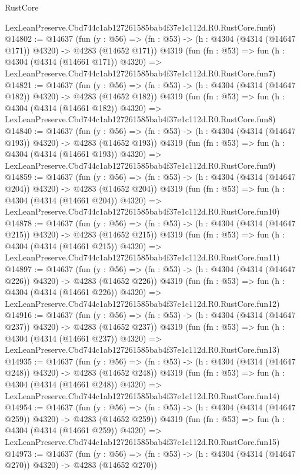 \begin{lexlean}{RustCore}
\begin{coremodule}
    LexLeanPreserve.Cbd744c1ab127261585bab4f37e1c112d.R0.RustCore.fun6)
@14802 := @14637
    (fun (y : @56) => (fn : @53) -> (h : @4304 (@4314 (@14647 @171)) @4320) -> @4283 (@14652 @171))
    @4319
    (fun (fn : @53) =>
    fun (h : @4304 (@4314 (@14661 @171)) @4320) =>
    LexLeanPreserve.Cbd744c1ab127261585bab4f37e1c112d.R0.RustCore.fun7)
@14821 := @14637
    (fun (y : @56) => (fn : @53) -> (h : @4304 (@4314 (@14647 @182)) @4320) -> @4283 (@14652 @182))
    @4319
    (fun (fn : @53) =>
    fun (h : @4304 (@4314 (@14661 @182)) @4320) =>
    LexLeanPreserve.Cbd744c1ab127261585bab4f37e1c112d.R0.RustCore.fun8)
@14840 := @14637
    (fun (y : @56) => (fn : @53) -> (h : @4304 (@4314 (@14647 @193)) @4320) -> @4283 (@14652 @193))
    @4319
    (fun (fn : @53) =>
    fun (h : @4304 (@4314 (@14661 @193)) @4320) =>
    LexLeanPreserve.Cbd744c1ab127261585bab4f37e1c112d.R0.RustCore.fun9)
@14859 := @14637
    (fun (y : @56) => (fn : @53) -> (h : @4304 (@4314 (@14647 @204)) @4320) -> @4283 (@14652 @204))
    @4319
    (fun (fn : @53) =>
    fun (h : @4304 (@4314 (@14661 @204)) @4320) =>
    LexLeanPreserve.Cbd744c1ab127261585bab4f37e1c112d.R0.RustCore.fun10)
@14878 := @14637
    (fun (y : @56) => (fn : @53) -> (h : @4304 (@4314 (@14647 @215)) @4320) -> @4283 (@14652 @215))
    @4319
    (fun (fn : @53) =>
    fun (h : @4304 (@4314 (@14661 @215)) @4320) =>
    LexLeanPreserve.Cbd744c1ab127261585bab4f37e1c112d.R0.RustCore.fun11)
@14897 := @14637
    (fun (y : @56) => (fn : @53) -> (h : @4304 (@4314 (@14647 @226)) @4320) -> @4283 (@14652 @226))
    @4319
    (fun (fn : @53) =>
    fun (h : @4304 (@4314 (@14661 @226)) @4320) =>
    LexLeanPreserve.Cbd744c1ab127261585bab4f37e1c112d.R0.RustCore.fun12)
@14916 := @14637
    (fun (y : @56) => (fn : @53) -> (h : @4304 (@4314 (@14647 @237)) @4320) -> @4283 (@14652 @237))
    @4319
    (fun (fn : @53) =>
    fun (h : @4304 (@4314 (@14661 @237)) @4320) =>
    LexLeanPreserve.Cbd744c1ab127261585bab4f37e1c112d.R0.RustCore.fun13)
@14935 := @14637
    (fun (y : @56) => (fn : @53) -> (h : @4304 (@4314 (@14647 @248)) @4320) -> @4283 (@14652 @248))
    @4319
    (fun (fn : @53) =>
    fun (h : @4304 (@4314 (@14661 @248)) @4320) =>
    LexLeanPreserve.Cbd744c1ab127261585bab4f37e1c112d.R0.RustCore.fun14)
@14954 := @14637
    (fun (y : @56) => (fn : @53) -> (h : @4304 (@4314 (@14647 @259)) @4320) -> @4283 (@14652 @259))
    @4319
    (fun (fn : @53) =>
    fun (h : @4304 (@4314 (@14661 @259)) @4320) =>
    LexLeanPreserve.Cbd744c1ab127261585bab4f37e1c112d.R0.RustCore.fun15)
@14973 := @14637
    (fun (y : @56) => (fn : @53) -> (h : @4304 (@4314 (@14647 @270)) @4320) -> @4283 (@14652 @270))

\end{coremodule}
\end{lexlean}
